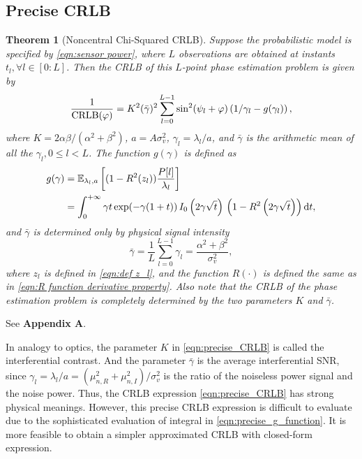 \documentclass[12pt,draftclsnofoot,journal,onecolumn]{IEEEtran}
\newtheorem{theorem}{\bf Theorem}
\theoremstyle{nonumberplain}
\def \exp {\text{exp}}
\begin{document}
\subsection{Precise CRLB}
    \begin{theorem}[Noncentral Chi-Squared CRLB] \label{thm:precise CRLB}
        Suppose the probabilistic model is specified by \eqref{eqn:sensor power}, where $L$ observations are obtained at instants $t_l, \forall l\in[0:L]$. Then the CRLB of this $L$-point phase estimation problem is given by
        \begin{equation}
            \frac{1}{{\rm CRLB}(\varphi)} = K^2(\bar{\gamma})^2 \sum_{l=0}^{L-1}\sin^2(\psi_l+\varphi)\left(1/\gamma_l-g(\gamma_l)\right),
            \label{eqn:precise_CRLB}
        \end{equation}
        where $K=2\alpha\beta/(\alpha^2+\beta^2)$, $a=A\sigma_v^2$, $\gamma_l=\lambda_l/a$, and $\bar{\gamma}$ is the arithmetic mean of all the $\gamma_l, 0\leq l<L$. The function $g(\gamma)$ is defined as 
        \begin{equation}
            \begin{aligned}
                g(\gamma) &= \mathbb{E}_{\lambda_l, a}\left[(1-R^2(z_l))\frac{P[l]}{\lambda_l}\right] \\
                & = \int_{0}^{+\infty}\gamma t \, \exp(-\gamma(1+t))\, I_0\left(2\gamma\sqrt{t}\right)\,\left(1-R^2\left(2\gamma\sqrt{t}\right)\right){\rm d}t,
            \end{aligned}
            \label{eqn:precise_g_function}
        \end{equation}
        and $\bar{\gamma}$ is determined only by physical signal intensity
        \begin{equation}
            \bar{\gamma} = \frac{1}{L}\sum_{l=0}^{L-1}{\gamma_l} = \frac{\alpha^2+\beta^2}{\sigma_v^2},
        \end{equation}
        where $z_l$ is defined in \eqref{eqn:def z_l}, and the function $R(\cdot)$ is defined the same as in \eqref{eqn:R function derivative property}. Also note that the CRLB of the phase estimation problem is completely determined by the two parameters $K$ and $\bar{\gamma}$. 
    \end{theorem}
    \begin{IEEEproof}
        See {\bf Appendix A}. 
    \end{IEEEproof}
    In analogy to optics, the parameter $K$ in \eqref{eqn:precise_CRLB} is called the interferential contrast. And the parameter $\bar{\gamma}$ is the average interferential SNR, since $\gamma_l=\lambda_l/a = (\mu_{n,R}^2+\mu_{n,I}^2)/\sigma_v^2$ is the ratio of the noiseless power signal and the noise power. Thus, the CRLB expression \eqref{eqn:precise_CRLB} has strong physical meanings. However, this precise CRLB expression is difficult to evaluate due to the sophisticated evaluation of integral in \eqref{eqn:precise_g_function}. It is more feasible to obtain a simpler approximated CRLB with closed-form expression. 
\end{document}
